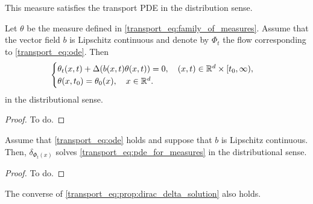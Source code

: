 \documentclass{article}
\begin{document}
This measure satisfies the transport PDE in the distribution sense. 
\begin{proposition}
Let $\theta$ be the measure defined in \eqref{transport_eq:family_of_measures}. Assume that the vector field $b$ is Lipschitz continuous and denote by $\Phi_t$ the flow corresponding to \eqref{transport_eq:ode}. Then
\begin{equation}\label{transport_eq:pde_for_measures}
    \begin{cases}
        \theta_t(x,t) + \Delta(b(x,t) \theta(x,t)) = 0, \quad (x,t) \in \mathbb{R}^d \times [t_0,\infty),\\
        \theta(x,t_0) = \theta_0(x), \quad x\in \mathbb{R}^d.
    \end{cases}
\end{equation}
in the distributional sense.
\end{proposition}

\begin{proof}
    To do.
\end{proof}

\begin{proposition}\label{transport_eq:prop:dirac_delta_solution}
Assume that \eqref{transport_eq:ode} holds and suppose that $b$ is Lipschitz continuous. Then, $\delta_{\Phi_t(x)}$ solves \eqref{transport_eq:pde_for_measures} in the distributional sense.
\end{proposition}

\begin{proof}
    To do.
\end{proof}

\begin{remark} The converse of \eqref{transport_eq:prop:dirac_delta_solution} also holds.
\end{remark}

\printbibliography
\end{document}
